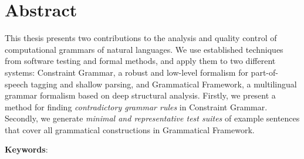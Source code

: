 \chapter*{Abstract}\label{chp:abstract}





This thesis presents two contributions to the analysis and quality
control of computational grammars of natural languages. We use
established techniques from software testing and formal methods, and
apply them to two different systems: Constraint Grammar, a robust and
low-level formalism for part-of-speech tagging and shallow parsing,
and Grammatical Framework, a multilingual grammar formalism based on
deep structural analysis.
Firstly, we present a method for finding \emph{contradictory grammar rules} in
Constraint Grammar. Secondly, we generate \emph{minimal and
  representative test suites} of example sentences that cover all
grammatical constructions in Grammatical Framework.



\bigskip
\noindent
\textbf{Keywords}: \emph{\phdkeywords}
